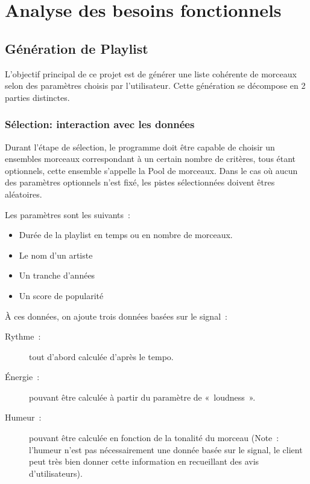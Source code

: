 \section{Analyse des besoins fonctionnels}
\label{besoins:fonc}

\subsection{Génération de Playlist}
\label{besoins:fonc:generation}

L’objectif principal de ce projet est de générer une liste cohérente de morceaux
selon des paramètres choisis par l’utilisateur. Cette génération se décompose en 2 parties distinctes.

\subsubsection{Sélection: interaction avec les données}
\label{besoins:fonc:generation:selection}

Durant l’étape de sélection, le programme doit être capable de choisir un ensembles
morceaux correspondant à un certain nombre de critères, tous étant optionnels, 
cette ensemble s'appelle la Pool de morceaux.
Dans le cas où aucun des paramètres optionnels n’est fixé, les pistes
sélectionnées doivent êtres aléatoires.

\vspace{3mm}
\noindent Les paramètres sont les suivants~:
\begin{itemize}
\item Durée de la playlist en temps ou en nombre de morceaux.
\item Le nom d'un artiste
\item Un tranche d'années
\item Un score de popularité
\end{itemize}

\vspace{3mm}
\noindent À ces données, on ajoute trois données basées sur le signal~:
\begin{description}
\item[Rythme~:] tout d’abord calculée d’après le tempo.
\item[Énergie~:] pouvant être calculée à partir du paramètre de «~loudness~».
\item[Humeur~:] pouvant être calculée en fonction de la tonalité du morceau (Note~: l’humeur
n’est pas nécessairement une donnée basée sur le signal, le client peut très bien
donner cette information en recueillant des avis d’utilisateurs).
\end{description}

